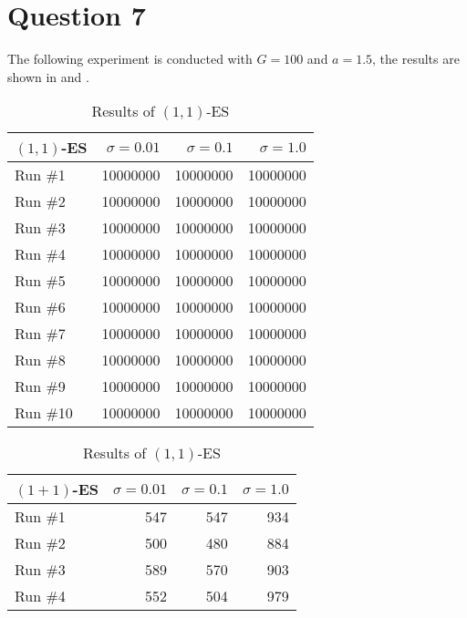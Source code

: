 \documentclass[12pt,letterpaper]{article}
\begin{document}
\section*{Question 7}
The following experiment is conducted with $G = 100$ and $a = 1.5$, the results are shown in  and .
\begin{table}[H]
    \parbox{.5\linewidth}{
        \centering
        \begin{tabular}{l|r|r|r}
            $(1, 1)$-ES & $\sigma = 0.01$ & $\sigma = 0.1$ & $\sigma = 1.0$ \\ \hline
            Run \#1      & 10000000       & 10000000       & 10000000       \\ \hline
            Run \#2      & 10000000       & 10000000       & 10000000       \\ \hline
            Run \#3      & 10000000       & 10000000       & 10000000       \\ \hline
            Run \#4      & 10000000       & 10000000       & 10000000       \\ \hline
            Run \#5      & 10000000       & 10000000       & 10000000       \\ \hline
            Run \#6      & 10000000       & 10000000       & 10000000       \\ \hline
            Run \#7      & 10000000       & 10000000       & 10000000       \\ \hline
            Run \#8      & 10000000       & 10000000       & 10000000       \\ \hline
            Run \#9      & 10000000       & 10000000       & 10000000       \\ \hline
            Run \#10     & 10000000       & 10000000       & 10000000       \\
        \end{tabular}
        \caption{Results of $(1, 1)$-ES}
        \label{tab:7a}
    }
    \hfill
    \parbox{.5\linewidth}{
        \centering
        \begin{tabular}{l|r|r|r}
            $(1 + 1)$-ES & $\sigma = 0.01$ & $\sigma = 0.1$ & $\sigma = 1.0$ \\ \hline
            Run \#1  & 547      & 547     & 934     \\ \hline
            Run \#2  & 500      & 480     & 884     \\ \hline
            Run \#3  & 589      & 570     & 903     \\ \hline
            Run \#4  & 552      & 504     & 979     \\ \hline

\end{tabular}}
\end{table}
\end{document}
